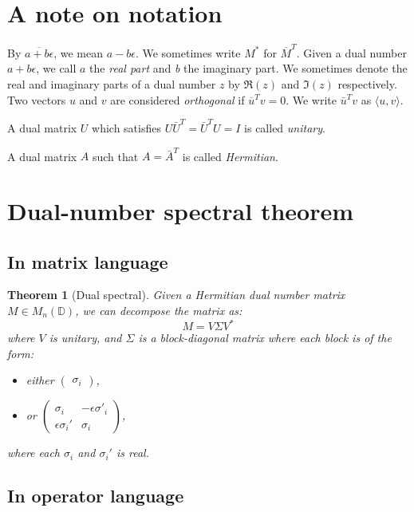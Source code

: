 \documentclass[
]{article}
\theoremstyle{theorem}
\newtheorem*{theorem}{Theorem}
\theoremstyle{proposition}
\begin{document}
\hypertarget{a-note-on-notation}{%
\section{A note on notation}\label{a-note-on-notation}}

By \(\overline{a + b\epsilon}\), we mean \(a - b\epsilon\). We sometimes write \(M^*\) for \(\overline M^T\). Given a dual number \(a + b\epsilon\), we call \(a\) the \emph{real part} and \emph{b} the imaginary part. We sometimes denote the real and imaginary parts of a dual number \(z\) by \(\Re(z)\) and \(\Im(z)\) respectively. Two vectors \(u\) and \(v\) are considered \emph{orthogonal} if \(\overline u^T v = 0\). We write \(\bar u^T v\) as \(\langle u, v \rangle\).

A dual matrix \(U\) which satisfies \(U\bar U^T = \bar U^T U = I\) is called \emph{unitary}.

A dual matrix \(A\) such that \(A = \bar A^T\) is called \emph{Hermitian}.

\section{Dual-number spectral theorem}
\subsection{In matrix language}

\begin{theorem}[Dual spectral]
Given a Hermitian dual number matrix \(M \in M_n(\mathbb D)\), we can decompose the matrix as: \[M = V\Sigma V^*\] where \(V\) is unitary, and \(\Sigma\) is a block-diagonal matrix where each block is of the form:

\begin{itemize}
\item
  either \(\begin{pmatrix}\sigma_i\end{pmatrix}\),
\item
  or \(\begin{pmatrix}\sigma_i & -\epsilon \sigma'_i \\ \epsilon\sigma_i' & \sigma_i\end{pmatrix}\),
\end{itemize}

where each \(\sigma_i\) and \(\sigma_i'\) is real.

\end{theorem}

\subsection{In operator language}
\end{document}
